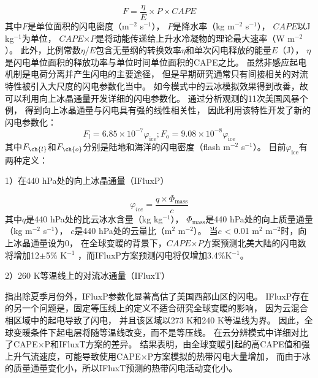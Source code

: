 \begin{equation} \label{eq:ltng_cape}
F = \frac{\eta}{E} \times P \times CAPE
\end{equation}
其中$F$是单位面积的闪电密度（m$^{-2}$ s$^{-1}$），
$P$是降水率（kg m$^{-2}$ s$^{-1}$），
$CAPE$以J kg$^{-1}$为单位，
$CAPE$$\times$$P$是将动能传递给上升水冷凝物的理论最大速率（W m$^{-2}$）。
此外，比例常数$\eta$/$E$包含无量纲的转换效率$\eta$和单次闪电释放的能量$E$（J），
$\eta$是闪电单位面积的释放功率与单位时间单位面积的CAPE之比。
虽然非感应起电机制是电荷分离并产生闪电的主要途径\citep{Barthe.2007,Saunders.2008}，
但是早期研究通常只有间接相关的对流特性被引入大尺度的闪电参数化当中。
如今模式中的云冰模拟效果得到改善，故可以利用向上冰晶通量开发详细的闪电参数化。
\citet{Deierling.2008}通过分析观测的11次美国风暴个例，
得到向上冰晶通量与闪电具有强的线性相关性，
因此\citet{Finney.2014}利用该特性开发了新的闪电参数化：
\begin{equation} \label{eq:ltng_ice}
F_\mathrm{l} = 6.85\times10^{-7}\varphi_\mathrm{ice};
F_\mathrm{o} = 9.08\times10^{-8}\varphi_\mathrm{ice}
\end{equation}
其中$F_{\ch{l}}$和$F_{\ch{o}}$分别是陆地和海洋的闪电密度（flash m$^{-2}$ s$^{-1}$）。
目前$\varphi_\mathrm{ice}$有两种定义：

1）在440 hPa处的向上冰晶通量（IFluxP）

\begin{equation} \label{eq:ltng_iflux}
\varphi_{ice} = \frac{q\times\Phi_\mathrm{mass}}{c}
\end{equation}
其中$q$是440 hPa处的比云冰水含量（kg kg$^{-1}$），
$\Phi_\mathrm{mass}$是440 hPa处的向上质量通量（kg m$^{-2}$ s$^{-1}$），
$c$是440 hPa处的云量比（m$^2$ m$^{-2}$）。
当$c$ < 0.01 m$^2$ m$^{-2}$时，向上冰晶通量设为0，
在全球变暖的背景下，$CAPE$$\times$$P$方案预测北美大陆的闪电数将增加12$\pm$5\% K$^{-1}$ \citep{Romps.2014}，而IFluxP方案预测闪电将仅增加3.4\%K$^{-1}$。

2）260 K等温线上的对流冰通量（IFluxT）

\citet{Romps.2019}指出除夏季月份外，IFluxP参数化显著高估了美国西部山区的闪电。
IFluxP存在的另一个问题是，固定等压线上的定义不适合研究全球变暖的影响，
因为云混合相区域中的起电导致了闪电\citep{Williams.1991}，
并且该区域以273 K和240 K等温线为界。
因此，全球变暖条件下起电层将随等温线改变，而不是等压线。
\citet{Romps.2019}在云分辨模式中详细对比了CAPE$\times$P和IFluxT方案的差异。
结果表明，由全球变暖引起的高CAPE值和强上升气流速度，可能导致使用CAPE$\times$P方案模拟的热带闪电大量增加，
而由于冰的质量通量变化小，所以IFluxT预测的热带闪电活动变化小。

